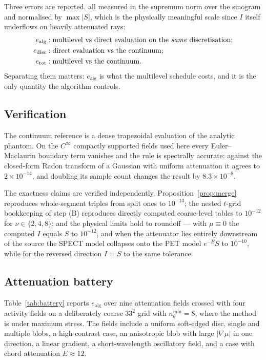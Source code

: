 \documentclass[11pt]{article}
\begin{document}
Three errors are reported, all measured in the supremum norm over the sinogram
and normalised by $\max|S|$, which is the physically meaningful scale since $I$
itself underflows on heavily attenuated rays:
\begin{align*}
  e_{\mathrm{alg}}  &: \text{multilevel vs direct evaluation on the \emph{same} discretisation};\\
  e_{\mathrm{disc}} &: \text{direct evaluation vs the continuum};\\
  e_{\mathrm{tot}}  &: \text{multilevel vs the continuum}.
\end{align*}
Separating them matters: $e_{\mathrm{alg}}$ is what the multilevel schedule
costs, and it is the only quantity the algorithm controls.

\subsection{Verification}

The continuum reference is a dense trapezoidal evaluation of the analytic
phantom. On the $C^\infty$ compactly supported fields used here every
Euler--Maclaurin boundary term vanishes and the rule is spectrally accurate:
against the closed-form Radon transform of a Gaussian with uniform attenuation
it agrees to $2\times10^{-14}$, and doubling its sample count changes the
result by $8.3\!\times\!10^{-8}$.

The exactness claims are verified independently. Proposition~\ref{prop:merge}
reproduces whole-segment triples from split ones to $10^{-13}$; the nested
$t$-grid bookkeeping of step (B) reproduces directly computed coarse-level
tables to $10^{-12}$ for $\nu\in\{2,4,8\}$; and the physical limits hold to
roundoff --- with $\mu\equiv0$ the computed $I$ equals $S$ to $10^{-12}$, and
when the attenuator lies entirely downstream of the source the SPECT model
collapses onto the PET model $e^{-E}S$ to $10^{-10}$, while for the reversed
direction $I=S$ to the same tolerance.

\subsection{Attenuation battery}
\label{sec:battery}

Table~\ref{tab:battery} reports $e_{\mathrm{alg}}$ over nine attenuation fields
crossed with four activity fields on a deliberately coarse $33^2$ grid with
$n_\theta^{\min}=8$, where the method is under maximum stress. The fields
include a uniform soft-edged disc, single and multiple blobs, a high-contrast
case, an anisotropic blob with large $|\nabla\mu|$ in one direction, a linear
gradient, a short-wavelength oscillatory field, and a case with chord
attenuation $E\approx 12$.
\end{document}
